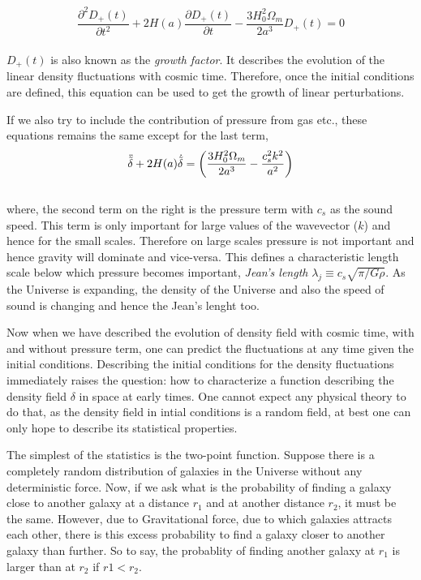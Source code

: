 \begin{equation}
	\dfrac{\partial^2 D_+(t)}{\partial t^2} + 2 H(a)
		\dfrac{\partial D_+(t)}{\partial t}
		- \dfrac{3H_0^2 \Omega_m}{2a^3} D_+(t) = 0
		\label{eqn:growthfactor}
\end{equation}
\\
$D_+(t)$ is also known as the {\it growth factor}. It describes the evolution of the
linear density fluctuations with cosmic time. Therefore, once the initial conditions
are defined, this equation can be used to get the growth of linear perturbations. 

If we also try to include the contribution of pressure from gas etc., these equations remains
the same except for the last term,
\begin{equation}
\centering
	\ddot{\tilde{\delta}} + 2H(a) \dot{\tilde{\delta}} = 
					\left( \dfrac{3H_0^2\Omega_m}{2a^3} - \dfrac{c_s^2k^2}{a^2}   \right)
\end{equation}
\\
where, the second term on the right is the pressure term with $c_s$ as the sound speed. 
This term is only important
for large values of the wavevector ($k$) and hence for the small scales. Therefore on 
large scales pressure is not important and hence gravity will dominate and vice-versa. 
This defines a characteristic length scale below which pressure becomes important, 
{\it Jean's length} $\lambda_j \equiv c_s \sqrt{\pi/G\rho}$. As the Universe is 
expanding, the density of the Universe and also the speed of sound is changing 
and hence the Jean's lenght too.

Now when we have described the evolution of density field with cosmic time, with and
without pressure term, one can predict the fluctuations at any time given the initial
conditions. Describing the initial conditions for the density fluctuations immediately
raises the question: how to characterize a function describing the density field $\delta$
in space at early times. One cannot expect any physical theory to do that, as the density field
in intial conditions is a random field, at best one can only hope to describe its
statistical properties. 

The simplest of the statistics is the two-point function. Suppose there is a 
completely random distribution of galaxies in the Universe without any deterministic 
force. Now, if we ask what is the probability of finding a galaxy close to another
galaxy at a distance $r_1$ and at another distance $r_2$, it must be the same. 
However, due to Gravitational force, due to which galaxies attracts each other, 
there is this excess probability to find a galaxy closer to another galaxy than
further. So to say, the probablity of finding another galaxy at $r_1$ is larger than
at $r_2$ if $r1<r_2$.

